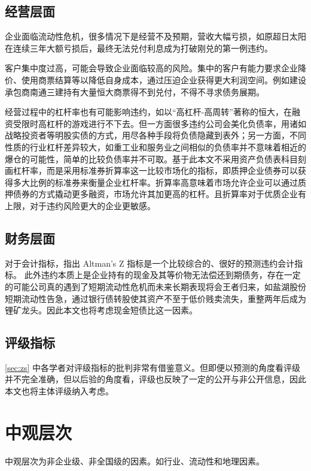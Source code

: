 \subsection{经营层面}
企业面临流动性危机，很多情况下是经营不及预期，营收大幅亏损，如原超日太阳在连续三年大额亏损后，最终无法兑付利息成为打破刚兑的第一例违约。

客户集中度过高，可能会导致企业面临较高的风险\cite{王雄元2017客户集中度与公司债二级市场信用利差}。集中的客户有能力要求企业降价、使用商票结算等以降低自身成本，通过压迫企业获得更大利润空间。例如建设承包商南通三建持有大量恒大商票得不到兑付，不得不寻求债务展期。

经营过程中的杠杆率也有可能影响违约\cite{王永钦2019杠杆率如何影响资产价格}，如以“高杠杆-高周转”著称的恒大，在融资受限时高杠杆的游戏进行不下去。但一方面很多违约公司会美化负债率，用诸如战略投资者等明股实债的方式，用尽各种手段将负债隐藏到表外；另一方面，不同性质的行业杠杆差异较大，如重工业和服务业之间相似的负债率并不意味着相近的爆仓的可能性，简单的比较负债率并不可取。基于此本文不采用资产负债表科目刻画杠杆率，而是采用标准券折算率这一比较市场化的指标，即质押企业债券可以获得多大比例的标准券来衡量企业杠杆率。折算率高意味着市场允许企业可以通过质押债券的方式撬动更多融资，市场允许其加更高的杠杆。且折算率对于优质企业有上限，对于违约风险更大的企业更敏感。

\subsection{财务层面}
对于会计指标，\Textcite{blochlinger2018ratings}指出 Altman's Z 指标是一个比较综合的、很好的预测违约会计指标。
此外违约本质上是企业持有的现金及其等价物无法偿还到期债务，存在一定的可能公司真的遇到了短期流动性危机而未来长期表现将会王者归来，如盐湖股份短期流动性告急，通过银行债转股使其资产不至于低价贱卖流失，重整两年后成为锂矿龙头。因此本文也将考虑现金短债比这一因素。
\subsection{评级指标}
\ref{sec:zs} 中各学者对评级指标的批判非常有借鉴意义。但即便以预测的角度看评级并不完全准确，但以后验的角度看，评级也反映了一定的公开与非公开信息，因此本文也将主体评级纳入考虑。
\section{中观层次}
中观层次为非企业级、非全国级的因素。如行业、流动性和地理因素。

